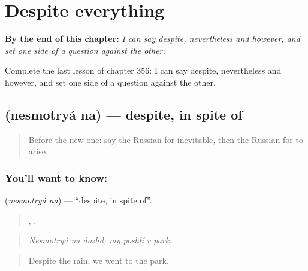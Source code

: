
\chapter{Despite everything}
\label{ch:ru-despite-everything}

\begin{chapteropening}
\textbf{By the end of this chapter:} \emph{I can say despite, nevertheless and however, and set one side of a question against the other.}

Complete the last lesson of chapter 356: I can say despite, nevertheless and however, and set one side of a question against the other.
\end{chapteropening}

\section[\texorpdfstring{\ru{несмотря} \ru{на} (nesmotryá na)}{несмотря на (nesmotryá na)}]{  (nesmotryá na) — despite, in spite of}

\label{lesson:RU-C356-nesmotrya-na}



\begin{quote}
Before the new one: say the Russian for inevitable, then the Russian for to arise.
\end{quote}

\subsection*{You'll want to know:  }
\textbf{ } (\emph{nesmotryá na}) — \textquotedblleft{}despite, in spite of\textquotedblright{}.

\begin{quote}
  ,    .
\end{quote}

\begin{quote}
\emph{Nesmotryá na dozhd, my poshlí v park.}
\end{quote}

\begin{quote}
Despite the rain, we went to the park.
\end{quote}

